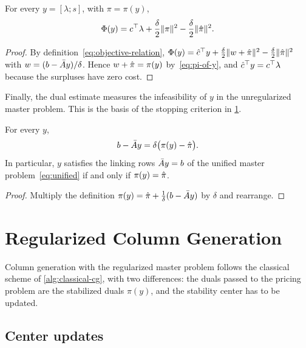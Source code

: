 \begin{prop} \label{prop:objective-value}
For every $y = [\lambda;s]$, with $\pi = \pi(y)$,
\[
\Phi(y) = c^\top\lambda + \frac{\delta}{2}\lVert\pi\rVert^2 - \frac{\delta}{2}\lVert\hat{\pi}\rVert^2 .
\]
\end{prop}

\begin{proof}
By definition~\eqref{eq:objective-relation}, $\Phi(y) = \hat{c}^\top y + \frac{\delta}{2}\lVert w+\hat{\pi}\rVert^2
- \frac{\delta}{2}\lVert\hat{\pi}\rVert^2$ with $w = (b - \bar{A} y)/\delta$. Hence $w + \hat{\pi} = \pi(y)$
by~\eqref{eq:pi-of-y}, and $\hat{c}^\top y = c^\top\lambda$ because the surpluses have zero cost.
\end{proof}

Finally, the dual estimate measures the infeasibility of $y$ in the unregularized master
problem. This is the basis of the stopping criterion in \cref{sec:center-update}.

\begin{prop} \label{prop:residual}
For every $y$,
\[
b - \bar{A} y = \delta\bigl(\pi(y) - \hat{\pi}\bigr).
\]
In particular, $y$ satisfies the linking rows $\bar{A} y = b$ of the unified master
problem~\eqref{eq:unified} if and only if $\pi(y) = \hat{\pi}$.
\end{prop}

\begin{proof}
Multiply the definition $\pi(y) = \hat{\pi} + \frac{1}{\delta}(b - \bar{A} y)$ by $\delta$ and
rearrange.
\end{proof}


\section{Regularized Column Generation}
\label{sec:center-update}

Column generation with the regularized master problem follows the classical scheme of
\cref{alg:classical-cg}, with two differences: the duals passed to the pricing problem are
the stabilized duals $\pi(y)$, and the stability center has to be updated.

\subsection{Center updates}

